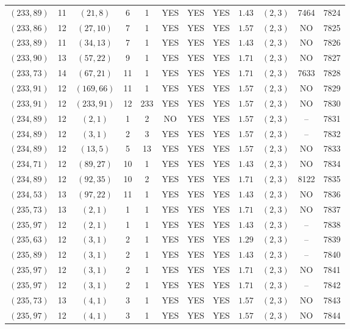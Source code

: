\begin{longtable}{|c|c|c|c|c|c|c|c|c|c|c|c|}
$(233,89)$ & 11 & $(21,8)$ & 6 & 1 & YES & YES & YES & $1.43$ & $(2,3)$ & 7464 & 7824\\
$(233,86)$ & 12 & $(27,10)$ & 7 & 1 & YES & YES & YES & $1.57$ & $(2,3)$ & NO & 7825\\
$(233,89)$ & 11 & $(34,13)$ & 7 & 1 & YES & YES & YES & $1.43$ & $(2,3)$ & NO & 7826\\
$(233,90)$ & 13 & $(57,22)$ & 9 & 1 & YES & YES & YES & $1.71$ & $(2,3)$ & NO & 7827\\
$(233,73)$ & 14 & $(67,21)$ & 11 & 1 & YES & YES & YES & $1.71$ & $(2,3)$ & 7633 & 7828\\
$(233,91)$ & 12 & $(169,66)$ & 11 & 1 & YES & YES & YES & $1.57$ & $(2,3)$ & NO & 7829\\
$(233,91)$ & 12 & $(233,91)$ & 12 & 233 & YES & YES & YES & $1.57$ & $(2,3)$ & NO & 7830\\
$(234,89)$ & 12 & $(2,1)$ & 1 & 2 & NO & YES & YES & $1.57$ & $(2,3)$ & -- & 7831\\
$(234,89)$ & 12 & $(3,1)$ & 2 & 3 & YES & YES & YES & $1.57$ & $(2,3)$ & -- & 7832\\
$(234,89)$ & 12 & $(13,5)$ & 5 & 13 & YES & YES & YES & $1.57$ & $(2,3)$ & NO & 7833\\
$(234,71)$ & 12 & $(89,27)$ & 10 & 1 & YES & YES & YES & $1.43$ & $(2,3)$ & NO & 7834\\
$(234,89)$ & 12 & $(92,35)$ & 10 & 2 & YES & YES & YES & $1.71$ & $(2,3)$ & 8122 & 7835\\
$(234,53)$ & 13 & $(97,22)$ & 11 & 1 & YES & YES & YES & $1.43$ & $(2,3)$ & NO & 7836\\
$(235,73)$ & 13 & $(2,1)$ & 1 & 1 & YES & YES & YES & $1.71$ & $(2,3)$ & NO & 7837\\
$(235,97)$ & 12 & $(2,1)$ & 1 & 1 & YES & YES & YES & $1.43$ & $(2,3)$ & -- & 7838\\
$(235,63)$ & 12 & $(3,1)$ & 2 & 1 & YES & YES & YES & $1.29$ & $(2,3)$ & -- & 7839\\
$(235,89)$ & 12 & $(3,1)$ & 2 & 1 & YES & YES & YES & $1.43$ & $(2,3)$ & -- & 7840\\
$(235,97)$ & 12 & $(3,1)$ & 2 & 1 & YES & YES & YES & $1.71$ & $(2,3)$ & NO & 7841\\
$(235,97)$ & 12 & $(3,1)$ & 2 & 1 & YES & YES & YES & $1.71$ & $(2,3)$ & -- & 7842\\
$(235,73)$ & 13 & $(4,1)$ & 3 & 1 & YES & YES & YES & $1.57$ & $(2,3)$ & NO & 7843\\
$(235,97)$ & 12 & $(4,1)$ & 3 & 1 & YES & YES & YES & $1.57$ & $(2,3)$ & NO & 7844\\

\end{longtable}
